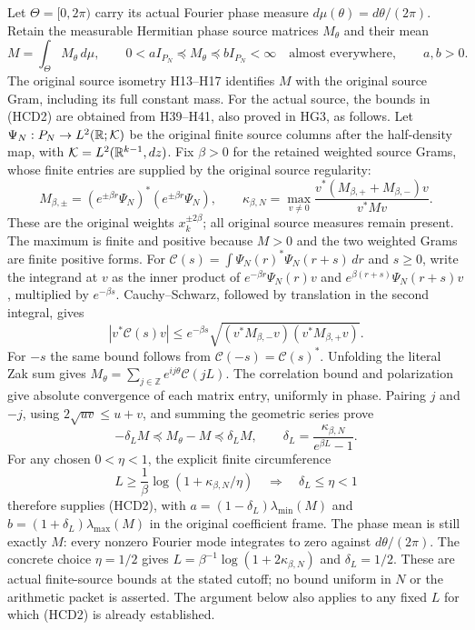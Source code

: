 Let $\Theta=[0,2\pi)$ carry its actual Fourier phase measure
$d\mu(\theta)=d\theta/(2\pi)$. Retain the measurable Hermitian
phase source matrices $M_\theta$ and their mean
\[
 M=\int_\Theta M_\theta\,d\mu,\qquad
 0<a I_{P_N}\preceq M_\theta\preceq b I_{P_N}<\infty
 \quad\text{almost everywhere},\qquad a,b>0.
 \tag{HCD2}
\]
The original source isometry H13--H17 identifies $M$ with the
original source Gram, including its full constant mass.
For the actual source, the bounds in (HCD2) are obtained from
H39--H41, also proved in HG3, as follows. Let
$\Psi_N:P_N\to L^2(\mathbb R;\mathcal K)$ be the original finite
source columns after the half-density map, with
$\mathcal K=L^2(\mathbb R^{k-1},dz)$. Fix $\beta>0$ for the retained
weighted source Grams, whose finite entries are supplied by
the original source regularity:
\[
 M_{\beta,\pm}=(e^{\pm\beta r}\Psi_N)^*
                    (e^{\pm\beta r}\Psi_N),\qquad
 \kappa_{\beta,N}=
 \max_{v\ne0}\frac{v^*(M_{\beta,+}+M_{\beta,-})v}{v^*Mv}.
 \tag{HCD2a}
\]
These are the original weights $x_k^{\pm2\beta}$; all original
source measures remain present. The maximum is finite and positive
because $M>0$ and the two weighted Grams are finite positive forms.
For $\mathcal C(s)=\int\Psi_N(r)^*\Psi_N(r+s)\,dr$ and $s\ge0$,
write the integrand at $v$ as the inner product of
$e^{-\beta r}\Psi_N(r)v$ and
$e^{\beta(r+s)}\Psi_N(r+s)v$, multiplied by $e^{-\beta s}$.
Cauchy--Schwarz, followed by translation in the second integral,
gives
\[
 |v^*\mathcal C(s)v|
 \le e^{-\beta s}
 \sqrt{(v^*M_{\beta,-}v)(v^*M_{\beta,+}v)} .
\]
For $-s$ the same bound follows from
$\mathcal C(-s)=\mathcal C(s)^*$.
Unfolding the literal Zak sum gives
$M_\theta=\sum_{j\in\mathbb Z}e^{ij\theta}\mathcal C(jL)$.
The correlation bound and polarization give absolute convergence
of each matrix entry, uniformly in phase. Pairing $j$ and $-j$,
using $2\sqrt{uv}\le u+v$, and summing the geometric series prove
\[
 -\delta_LM\preceq M_\theta-M\preceq\delta_LM,\qquad
 \delta_L=\frac{\kappa_{\beta,N}}{e^{\beta L}-1}.
 \tag{HCD2b}
\]
For any chosen $0<\eta<1$, the explicit finite circumference
\[
 L\ge\frac1\beta\log(1+\kappa_{\beta,N}/\eta)
 \quad\Longrightarrow\quad
 \delta_L\le\eta<1
 \tag{HCD2c}
\]
therefore supplies (HCD2), with
$a=(1-\delta_L)\lambda_{\min}(M)$ and
$b=(1+\delta_L)\lambda_{\max}(M)$ in the original coefficient
frame. The phase mean is still exactly $M$: every nonzero
Fourier mode integrates to zero against $d\theta/(2\pi)$.
The concrete choice $\eta=1/2$ gives
$L=\beta^{-1}\log(1+2\kappa_{\beta,N})$ and $\delta_L=1/2$.
These are actual finite-source bounds at the stated cutoff;
no bound uniform in $N$ or the arithmetic packet is asserted.
The argument below also applies to any fixed $L$ for which
(HCD2) is already established.

